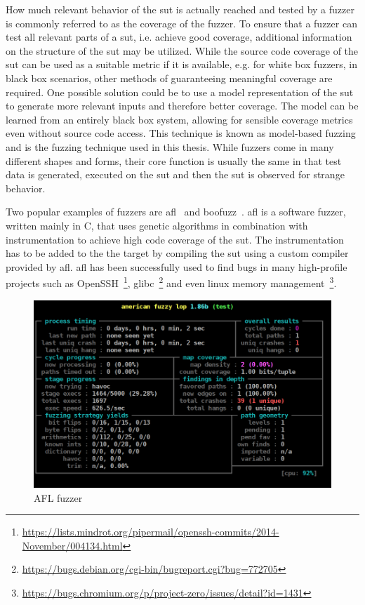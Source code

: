 How much relevant behavior of the \ac{sut} is actually reached and tested by a fuzzer is commonly referred to as the coverage of the fuzzer. To ensure that a fuzzer can test all relevant parts of a \ac{sut}, i.e. achieve good coverage, additional information on the structure of the \ac{sut} may be utilized. While the source code coverage of the \ac{sut} can be used as a suitable metric if it is available, e.g. for white box fuzzers, in black box scenarios, other methods of guaranteeing meaningful coverage are required. One possible solution could be to use a model representation of the \ac{sut} to generate more relevant inputs and therefore better coverage. The model can be learned from an entirely black box system, allowing for sensible coverage metrics even without source code access. This technique is known as model-based fuzzing and is the fuzzing technique used in this thesis. While fuzzers come in many different shapes and forms, their core function is usually the same in that test data is generated, executed on the \ac{sut} and then the \ac{sut} is observed for strange behavior.

Two popular examples of fuzzers are \ac{afl}~\cite{zalewskiafl} and boofuzz~\cite{pereyda2019boofuzz}. \ac{afl} is a software fuzzer, written mainly in C, that uses genetic algorithms in combination with instrumentation to achieve high code coverage of the \Ac{sut}. The instrumentation has to be added to the the target by compiling the \ac{sut} using a custom compiler provided by \ac{afl}. \ac{afl} has been successfully used to find bugs in many high-profile projects such as OpenSSH~\footnote{\url{https://lists.mindrot.org/pipermail/openssh-commits/2014-November/004134.html}}, glibc~\footnote{\url{https://bugs.debian.org/cgi-bin/bugreport.cgi?bug=772705}} and even linux memory management~\footnote{\url{https://bugs.chromium.org/p/project-zero/issues/detail?id=1431}}. 

\begin{figure}
	\centering
	\includegraphics[width=0.9\linewidth]{images/American_fuzzy_lop's_afl-fuzz_running_on_a_test_program}
	\caption{AFL fuzzer}
	\label{fig:americanfuzzylopsafl-fuzzrunningonatestprogram}
\end{figure}

